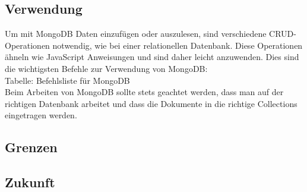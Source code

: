 \subsection{Verwendung}
Um mit MongoDB Daten einzufügen oder auszulesen, sind verschiedene CRUD-Operationen notwendig, wie bei einer relationellen Datenbank. Diese Operationen ähneln wie JavaScript Anweisungen und sind daher leicht anzuwenden. Dies sind die wichtigsten Befehle zur Verwendung von MongoDB:
\\
Tabelle: Befehlsliste für MongoDB
\\
Beim Arbeiten von MongoDB sollte stets geachtet werden, dass man auf der richtigen Datenbank arbeitet und dass die Dokumente in die richtige Collections eingetragen werden. 
\subsection{Grenzen}
\subsection{Zukunft}